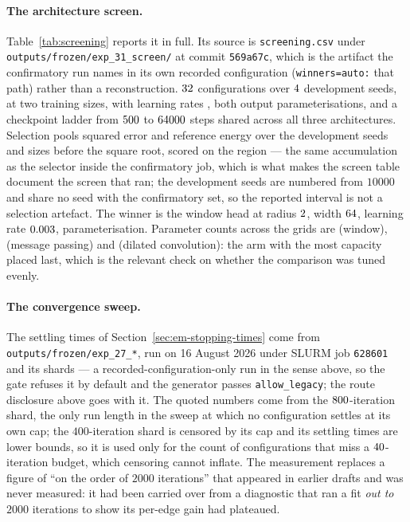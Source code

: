 \paragraph{The architecture screen.} Table~\ref{tab:screening} reports it in
full. Its source is \texttt{screening.csv} under
\texttt{outputs/frozen/exp\_31\_screen/} at commit \texttt{569a67c}, which is the
artifact the confirmatory run names in its own recorded configuration
(\texttt{winners=auto:} that path) rather than a reconstruction. $32$ configurations over $4$
development seeds, at two training sizes, with learning rates
\screenlrs{}, both output parameterisations, and a checkpoint ladder from
$500$ to $64000$ steps shared across all three
architectures. Selection pools squared error and reference energy over the
development seeds and sizes before the square root, scored on
the \screenregion{} region --- the same accumulation as the selector inside
the confirmatory job, which is what makes the screen table document the
screen that ran; the development seeds are numbered from $10000$ and
share no seed with the confirmatory set, so the reported interval is not a
selection artefact. The winner is the window head at radius
$2$, width $64$, learning rate
$0.003$, \screenwinnermode{} parameterisation. Parameter counts
across the grids are \screenwindowparams{} (window), \screenbimpparams{}
(message passing) and \screenconvparams{} (dilated convolution): the arm with
the most capacity placed last, which is the relevant check on whether the
comparison was tuned evenly.

\paragraph{The convergence sweep.}
The settling times of Section~\ref{sec:em-stopping-times} come from
\texttt{outputs/frozen/}\allowbreak\texttt{exp\_27\_*}, run on 16 August
2026 under SLURM job
\texttt{628601} and its shards --- a recorded-configuration-only run in the
sense above, so the gate refuses it by default and the generator passes
\texttt{allow\_legacy}; the route disclosure above goes with it.
The quoted numbers come
from the $800$-iteration shard, the only run length in the sweep at which
no configuration settles at its own cap; the $400$-iteration shard is censored
by its cap and its settling times are lower bounds, so it is used only for the
count of configurations that miss a $40$-iteration budget, which
censoring cannot inflate. The measurement replaces a figure of ``on the order of
$2000$ iterations'' that appeared in earlier drafts and was never measured: it
had been carried over from a diagnostic that ran a fit \emph{out to} $2000$
iterations to show its per-edge gain had plateaued.

